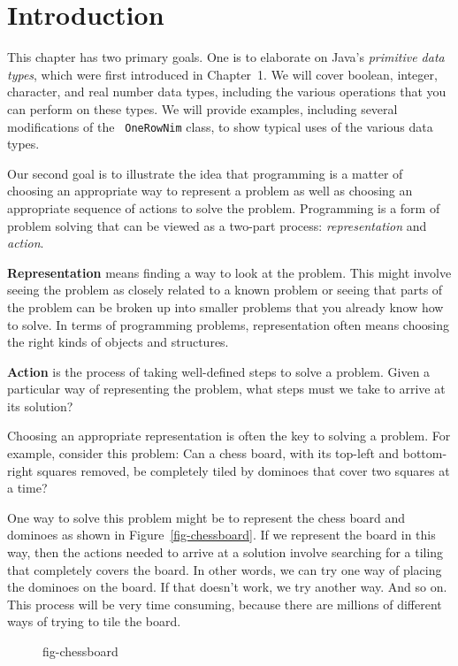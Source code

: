 \section{Introduction}
\label{introduction}
\noindent This chapter has two primary goals.  One is to elaborate on Java's
{\it primitive data types}, which were first introduced in Chapter~1.
We will cover boolean, integer, character, and real number data types,
including the various operations that you can perform on these types.
We will provide examples, including several modifications of the {\tt
OneRowNim} class, to show typical uses of the various data types.

Our second goal is to illustrate the idea that programming is a matter
of choosing an appropriate way to represent a problem as well as
choosing an appropriate sequence of actions to solve the problem.
Programming is a form of problem solving that can be viewed as a
two-part process: {\it representation} and {\it action}.

{\bf Representation} means finding a way to look at the problem.  This
might involve seeing the problem as closely related to a known problem
or seeing that parts of the problem can be broken up into smaller
problems that you already know how to solve.  In terms of programming
problems, representation often means choosing the right kinds of
objects and structures.

{\bf Action} is the process of taking well-defined steps to solve a
problem.  Given a particular way of representing the problem, what
steps must we take to arrive at its solution?

Choosing an appropriate representation is often the key to solving a
problem.  For example, consider this problem: Can a chess board, with
its top-left and bottom-right squares removed, be completely tiled by
dominoes that cover two squares at a time?

One way to solve this problem might be to represent the chess board and
dominoes as shown in Figure~\ref{fig-chessboard}. If we represent the
board in this way, then the actions needed to arrive at a solution
involve searching for a tiling that completely covers the board.  In
other words, we can try one way of placing the dominoes on the board.
If that doesn't work, we try another way.  And so on.  This process
will be very time consuming, because there are millions of different
ways of trying to tile the board.

\begin{figure}[tb]
 {fig-chessboard}
\end{figure}

